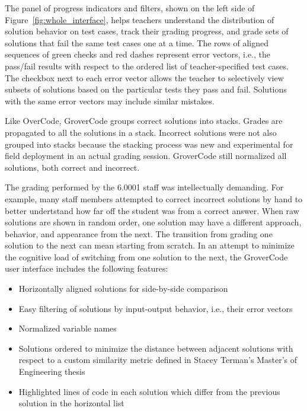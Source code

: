 

The panel of progress indicators and filters, shown on the left side of Figure~\ref{fig:whole_interface}, helps teachers understand the distribution of solution behavior on test cases, track their grading progress, and grade sets of solutions that fail the same test cases one at a time. The rows of aligned sequences of green checks and red dashes represent error vectors, i.e., the pass/fail results with respect to the ordered list of teacher-specified test cases. The checkbox next to each error vector allows the teacher to selectively view subsets of solutions based on the particular tests they pass and fail. Solutions with the same error vectors may include similar mistakes. 

Like OverCode, GroverCode groups correct solutions into stacks. Grades are propagated to all the solutions in a stack. Incorrect solutions were not also grouped into stacks because the stacking process was new and experimental for field deployment in an actual grading session. GroverCode still normalized all solutions, both correct and incorrect.

The grading performed by the 6.0001 staff was intellectually demanding. For example, many staff members attempted to correct incorrect solutions by hand to better undertstand how far off the student was from a correct answer. When raw solutions are shown in random order, one solution may have a different approach, behavior, and appearance from the next. The transition from grading one solution to the next can mean starting from scratch. In an attempt to minimize the cognitive load of switching from one solution to the next, the GroverCode user interface includes the following features:
\begin{itemize}
\item Horizontally aligned solutions for side-by-side comparison
\item Easy filtering of solutions by input-output behavior, i.e., their error vectors
\item Normalized variable names
\item Solutions ordered to minimize the distance between adjacent solutions with respect to a custom similarity metric defined in Stacey Terman's Master's of Engineering thesis~\cite{staceythesis}
\item Highlighted lines of code in each solution which differ from the previous solution in the horizontal list
\end{itemize}

